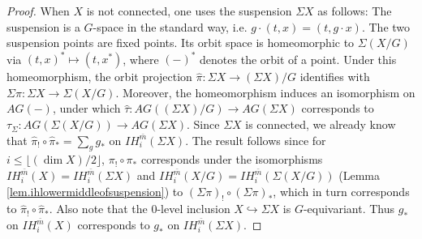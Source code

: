 \documentclass{amsart}
\theoremstyle{definition}
\theoremstyle{remark}
\newcommand {\bm}    {{\ensuremath{\bar{m}}}}
\begin{document}
\begin{proof}
When $X$ is not connected, one uses the suspension $\Sigma X$
as follows:
The suspension is a $G$-space in the standard way, i.e.
$g\cdot (t,x) = (t, g\cdot x)$. The two suspension points are fixed points.
Its orbit space is homeomorphic to $\Sigma (X/G)$ via
$(t,x)^* \mapsto (t,x^*)$, where $(-)^*$ denotes the orbit of a point.
Under this homeomorphism, the orbit projection
$\hat{\pi}: \Sigma X \to (\Sigma X)/G$ identifies with
$\Sigma \pi: \Sigma X \to \Sigma (X/G)$.
Moreover, the homeomorphism induces an isomorphism on $AG(-)$,
under which $\hat{\tau}: AG ((\Sigma X)/G) \to AG(\Sigma X)$
corresponds to
$\tau_\Sigma: AG(\Sigma (X/G)) \to AG (\Sigma X)$.
Since $\Sigma X$ is connected, we already know that
$\hat{\pi}_! \circ \hat{\pi}_* = \sum_g g_*$ on $IH^\bm_i (\Sigma X)$.
The result follows since for $i\leq \lfloor (\dim X)/2 \rfloor$, 
$\pi_! \circ \pi_*$ corresponds under the isomorphisms
$IH^\bm_i (X) = IH^\bm_i (\Sigma X)$ and
$IH^\bm_i (X/G) = IH^\bm_i (\Sigma (X/G))$
(Lemma \ref{lem.ihlowermiddleofsuspension})
to $(\Sigma \pi)_! \circ (\Sigma \pi)_*$, which in turn corresponds to
$\hat{\pi}_! \circ \hat{\pi}_*$. Also note that the 0-level inclusion
$X \hookrightarrow \Sigma X$ is $G$-equivariant. Thus
$g_*$ on $IH^\bm_i (X)$ corresponds to $g_*$ on $IH^\bm_i (\Sigma X)$.
\end{proof}
\end{document}
